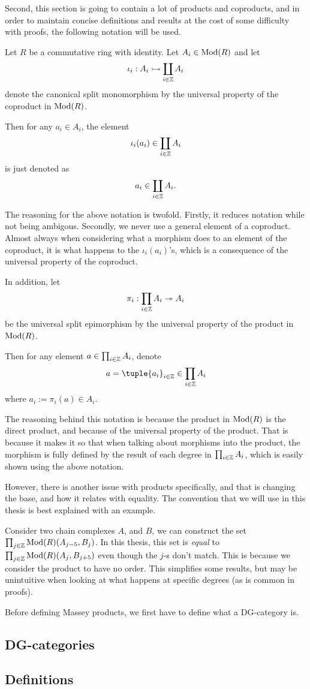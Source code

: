Second, this section is going to contain a lot of products and coproducts, and in order to maintain concise definitions and results at the cost of some difficulty with proofs, the following notation will be used.
\begin{notation}
    \label{not:coprod_prod_forvirring}
    Let \( R \) be a commutative ring with identity. Let \( A_i \in \operatorname{Mod}(R) \) and let
    \[
        \iota_i: A_i \rightarrowtail \coprod_{i \in {\mathbb{Z}}} A_i
    \]
    denote the canonical split monomorphism by the universal property of the coproduct in \( \operatorname{Mod}(R) \).

    Then for any \( a_i \in A_i \), the element
    \[
        \iota_i(a_i) \in \coprod_{i \in {\mathbb{Z}}} A_i
    \]
    is just denoted as
    \[
        a_i \in \coprod_{i \in {\mathbb{Z}}} A_i.
    \]
    
    The reasoning for the above notation is twofold. Firstly, it reduces notation while not being ambigous. Secondly, we never use a general element of a coproduct. Almost always when considering what a morphism does to an element of the coproduct, it is what happens to the \( \iota_i(a_i) \)'s, which is a consequence of the universal property of the coproduct.

    In addition, let 
    \[
        \pi_i: \prod_{i \in {\mathbb{Z}}} A_i \twoheadrightarrow A_i
    \]
    be the universal split epimorphism by the universal property of the product in \( \operatorname{Mod}(R) \).
    
    Then for any element \( a \in \prod_{i \in {\mathbb{Z}}} A_i \), denote
    \[
        a = \tuple{a_i}_{i \in \Zb} \in \prod_{i \in \Zb} A_i
    \]
    where \( a_i := \pi_i(a) \in A_i \).
    
    The reasoning behind this notation is because the product in \( \operatorname{Mod}(R) \) is the direct product, and because of the universal property of the product. That is because it makes it so that when talking about morphisms into the product, the morphism is fully defined by the result of each degree in \( \prod_{i \in {\mathbb{Z}}} A_i \), which is easily shown using the above notation.

    However, there is another issue with products specifically, and that is changing the base, and how it relates with equality. The convention that we will use in this thesis is best explained with an example.
    
    Consider two chain complexes \( A \), and \( B \), we can construct the set \( \prod_{j \in {\mathbb{Z}}} \operatorname{Mod}(R)(A_{j - 5}, B_j) \). In this thesis, this set is \emph{equal} to \( \prod_{j \in {\mathbb{Z}}} \operatorname{Mod}(R)(A_j, B_{j + 5}) \) even though the \( j \)-s don't match. This is because we consider the product to have no order. This simplifies some results, but may be unintuitive when looking at what happens at specific degrees (as is common in proofs).
\end{notation}

Before defining Massey products, we first have to define what a DG-category is.

\subsection{DG-categories}


\subsection{Definitions}

